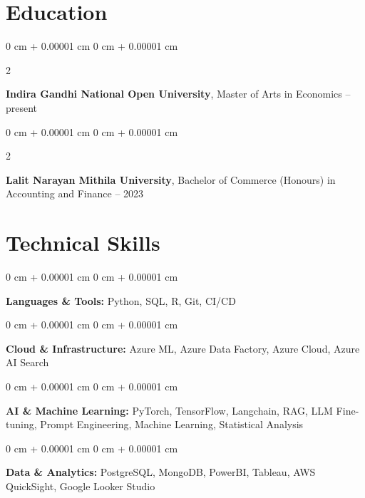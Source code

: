 \documentclass[10pt, letterpaper]{article}
\newenvironment{onecolentry}{
    \begin{adjustwidth}{
        0 cm + 0.00001 cm
    }{
        0 cm + 0.00001 cm
    }
}{
    \end{adjustwidth}
} %
\newenvironment{twocolentry}[2][]{
    \onecolentry
    \def\secondColumn{#2}
    \setcolumnwidth{\fill, 4.2 cm}
    \begin{paracol}{2}
}{
    \switchcolumn \raggedleft \secondColumn
    \end{paracol}
    \endonecolentry
} %
\begin{document}
    
    \section{Education}



        
        \begin{twocolentry}{
            2024 – present
        }
            \textbf{Indira Gandhi National Open University}, Master of Arts in Economics\end{twocolentry}



        \vspace{0.15 cm}

        \begin{twocolentry}{
            2020 – 2023
        }
            \textbf{Lalit Narayan Mithila University}, Bachelor of Commerce (Honours) in Accounting and Finance\end{twocolentry}




    
    \section{Technical Skills}



        
        \begin{onecolentry}
            \textbf{Languages \& Tools:} Python, SQL, R, Git, CI/CD
        \end{onecolentry}

        \vspace{0.15 cm}

        \begin{onecolentry}
            \textbf{Cloud \& Infrastructure:} Azure ML, Azure Data Factory, Azure Cloud, Azure AI Search
        \end{onecolentry}

        \vspace{0.15 cm}

        \begin{onecolentry}
            \textbf{AI \& Machine Learning:} PyTorch, TensorFlow, Langchain, RAG, LLM Fine-tuning, Prompt Engineering, Machine Learning, Statistical Analysis
        \end{onecolentry}

        \vspace{0.15 cm}

        \begin{onecolentry}
            \textbf{Data \& Analytics:} PostgreSQL, MongoDB, PowerBI, Tableau, AWS QuickSight, Google Looker Studio
        \end{onecolentry}
\end{document}
